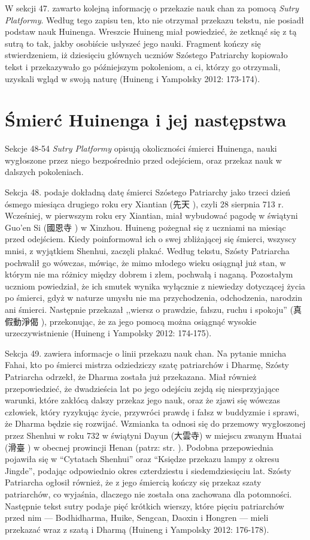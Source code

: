 W sekcji 47. zawarto kolejną informację o przekazie nauk chan za pomocą \textit{Sutry Platformy}. %
Według tego zapisu ten, kto nie otrzymał przekazu tekstu, nie posiadł podstaw nauk Huinenga.
Wreszcie Huineng miał powiedzieć, że zetknąć się z tą sutrą to tak, jakby osobiście usłyszeć jego nauki.
Fragment kończy się stwierdzeniem, iż dziesięciu głównych uczniów Szóstego Patriarchy kopiowało tekst i przekazywało go późniejszym pokoleniom, a ci, którzy go otrzymali, uzyskali wgląd w swoją naturę
(Huineng i Yampolsky 2012: 173-174).

\section{Śmierć Huinenga i jej następstwa}
Sekcje 48-54 \textit{Sutry Platformy} opisują okoliczności śmierci Huinenga, nauki wygłoszone przez niego bezpośrednio przed odejściem, oraz przekaz nauk w dalszych pokoleniach.

Sekcja 48. podaje dokładną datę śmierci Szóstego Patriarchy jako trzeci dzień ósmego miesiąca drugiego roku ery Xiantian (先天 ), czyli 28 sierpnia 713 r.
Wcześniej, w pierwszym roku ery Xiantian, miał wybudować pagodę w świątyni Guo'en Si (國恩寺 ) w Xinzhou.
Huineng pożegnał się z uczniami na miesiąc przed odejściem.
Kiedy poinformował ich o swej zbliżającej się śmierci, wszyscy mnisi, z wyjątkiem Shenhui, zaczęli płakać.
Według tekstu, Szósty Patriarcha pochwalił go wówczas, mówiąc, że mimo młodego wieku osiągnął już stan, w którym nie ma różnicy między dobrem i złem, pochwałą i naganą.
Pozostałym uczniom powiedział, że ich smutek wynika wyłącznie z niewiedzy dotyczącej życia po śmierci, gdyż w naturze umysłu nie ma przychodzenia, odchodzenia, narodzin ani śmierci.
Następnie przekazał ,,wiersz o prawdzie, fałszu, ruchu i spokoju'' (真假動淨偈 ), przekonując, że za jego pomocą można osiągnąć wysokie urzeczywistnienie
(Huineng i Yampolsky 2012: 174-175).

Sekcja 49. zawiera informacje o linii przekazu nauk chan.
Na pytanie mnicha Fahai, kto po śmierci mistrza odziedziczy szatę patriarchów i Dharmę, Szósty Patriarcha odrzekł, że Dharma została już przekazana.
Miał również przepowiedzieć, że dwadzieścia lat po jego odejściu zejdą się niesprzyjające warunki, które zakłócą dalszy przekaz jego nauk, oraz że zjawi się wówczas człowiek, który ryzykując życie, przywróci prawdę i fałsz w buddyzmie i sprawi, że Dharma będzie się rozwijać.
Wzmianka ta odnosi się do przemowy wygłoszonej przez Shenhui w roku 732 w świątyni Dayun (大雲寺) w miejscu zwanym Huatai (滑臺 ) w obecnej prowincji Henan (patrz: str. \pageref{Huatai}).
Podobna przepowiednia pojawiła się w ``Cytatach Shenhui'' oraz ``Księdze przekazu lampy z okresu Jingde'', podając odpowiednio okres czterdziestu i siedemdziesięciu lat.
Szósty Patriarcha ogłosił również, że z jego śmiercią kończy się przekaz szaty patriarchów, co wyjaśnia, dlaczego nie została ona zachowana dla potomności.
Następnie tekst sutry podaje pięć krótkich wierszy, które pięciu patriarchów przed nim --- Bodhidharma, Huike, Sengcan, Daoxin i Hongren --- mieli przekazać wraz z szatą i Dharmą
(Huineng i Yampolsky 2012: 176-178).

